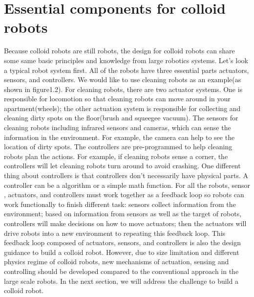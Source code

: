 \section{Essential components for colloid robots}
Because colloid robots are still robots, the design for colloid robots can share some same basic principles and knowledge from large robotics systems.  Let’s look a typical robot system first. All of the robots have three essential parts actuators, sensors, and controllers. We would like to use cleaning robots as an example(as shown in figure1.2).  For cleaning robots,  there are two actuator systems. One is responsible for locomotion so that cleaning robots can move around in your apartment(wheels); the other actuation system is responsible for collecting and cleaning dirty spots on the floor(brush and squeegee vacuum).
The sensors for cleaning robots including infrared  sensors and cameras, which can sense the information in the environment. For example, the camera can help to see the location of dirty spots. The controllers are pre-programmed  to help cleaning robots plan  the actions. For example, if cleaning robots sense a corner, the controllers will let cleaning robots turn around to avoid crashing. One different thing about controllers is that controllers don't necessarily have physical parts. A controller can be a algorithm or a simple math function.  For all the robots, sensor , actuators, and controllers must work together as a feedback loop so robots can work functionally to finish different task: sensors collect information from the environment; based on information from sensors as well as the target of robots,  controllers will make decisions  on how to move actuators; then the actuators will drive robots into a new environment to repeating this feedback loop. This feedback loop composed of actuators, sensors,  and controllers is also the design guidance to build a colloid robot. However, due to size limitation and different physics regime of colloid robots, new mechanisms of actuation, sensing and controlling should be developed compared to the conventional approach in the large scale robots.  In the next section, we will address the challenge to build a colloid robot. 

